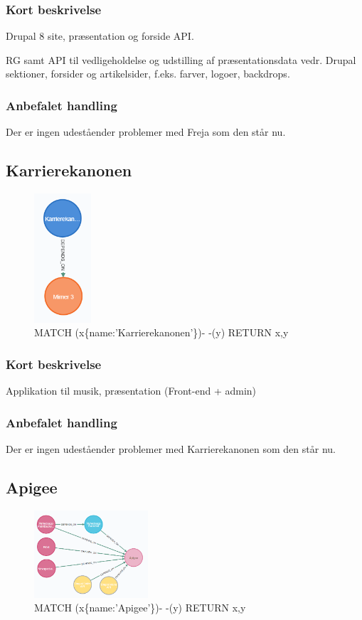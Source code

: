 \documentclass{article}
\begin{document}
\subsubsection{Kort beskrivelse}
Drupal 8 site, præsentation og forside API.	

RG samt API til vedligeholdelse og udstilling af præsentationsdata vedr. Drupal sektioner, forsider og artikelsider, f.eks. farver, logoer, backdrops.
\subsubsection{Anbefalet handling}
Der er ingen udeståender problemer med Freja som den står nu.


\subsection{Karrierekanonen}
\begin{figure}[h]
\includegraphics[width=60pt]{Karrierekanonen.PNG}
\caption{MATCH (x\{name:'Karrierekanonen'\})- -(y) RETURN x,y}
\end{figure}
\subsubsection{Kort beskrivelse}
Applikation til musik, præsentation (Front-end + admin)
\subsubsection{Anbefalet handling}
Der er ingen udeståender problemer med Karrierekanonen som den står nu.


\subsection{Apigee}
\begin{figure}[h]
\includegraphics[width=120pt]{Apigee.PNG}
\caption{MATCH (x\{name:'Apigee'\})- -(y) RETURN x,y}
\end{figure}
\end{document}
